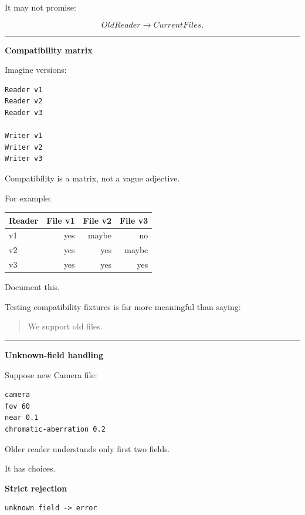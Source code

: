 It may not promise:

\[
OldReader
\rightarrow
CurrentFiles.
\]

\begin{center}\rule{0.5\linewidth}{0.5pt}\end{center}

\textbf{Compatibility matrix}

Imagine versions:

\begin{verbatim}
Reader v1
Reader v2
Reader v3

Writer v1
Writer v2
Writer v3
\end{verbatim}

Compatibility is a matrix, not a vague adjective.

For example:

{\def\LTcaptype{none} %
\begin{longtable}[]{@{}lrrr@{}}
\toprule\noalign{}
Reader & File v1 & File v2 & File v3 \\
\midrule\noalign{}
\endhead
\bottomrule\noalign{}
\endlastfoot
v1 & yes & maybe & no \\
v2 & yes & yes & maybe \\
v3 & yes & yes & yes \\
\end{longtable}
}

Document this.

Testing compatibility fixtures is far more meaningful than saying:

\begin{quote}
We support old files.
\end{quote}

\begin{center}\rule{0.5\linewidth}{0.5pt}\end{center}

\textbf{Unknown-field handling}

Suppose new Camera file:

\begin{verbatim}
camera
fov 60
near 0.1
chromatic-aberration 0.2
\end{verbatim}

Older reader understands only first two fields.

It has choices.

\textbf{Strict rejection}

\begin{verbatim}
unknown field -> error
\end{verbatim}

